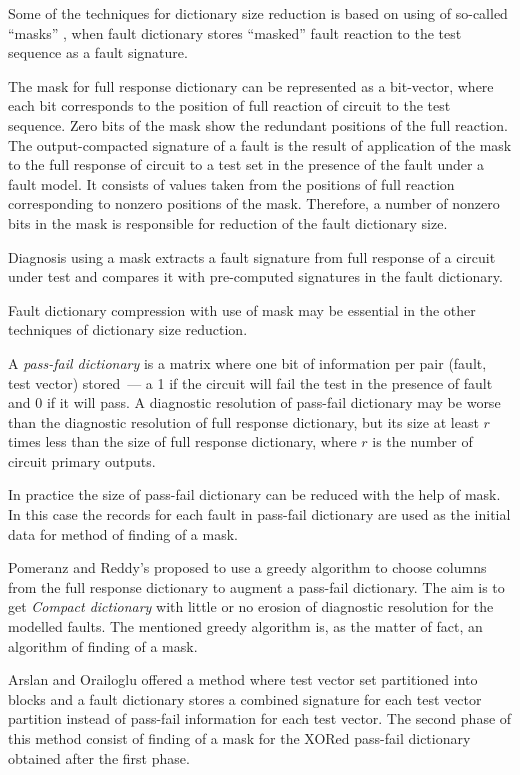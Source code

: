 \documentclass{article}
\begin{document}
Some of the techniques for dictionary size reduction is based on
using of so-called ``masks'' \cite{Speran-book, Chipulis-75-1,
Chipulis-75-2, Chipulis-77, Malyshenko-Razdobreev, Sharshunov-73,
Speranskiy-84, Speranskiy-Shatokhina-85}, when fault dictionary
stores ``masked'' fault reaction to the test sequence as a fault
signature.

The mask for full response dictionary can be represented as a
bit-vector, where each bit corresponds to the position of full
reaction of circuit to the test sequence. Zero bits of the mask
show the redundant positions of the full reaction. The
output-compacted signature of a fault is the result of application
of the mask to the full response of circuit to a test set in the
presence of the fault under a fault model. It consists of  values
taken from the positions of full reaction corresponding to nonzero
positions of the mask. Therefore, a number of nonzero bits in the
mask is responsible for reduction of the fault dictionary size.

Diagnosis using a mask extracts a fault signature from full
response of a circuit under test and compares it with pre-computed
signatures in the fault dictionary.

Fault dictionary compression with use of mask may be essential in
the other techniques of dictionary size reduction.

A \emph{pass-fail dictionary} is a matrix where one bit of
information per pair (fault, test vector) stored~--- a 1 if the
circuit will fail the test in the presence of fault and 0 if it
will pass. A diagnostic resolution of pass-fail dictionary may be
worse than the diagnostic resolution of full response dictionary,
but its size at least $r$ times less than the size of full
response dictionary, where $r$ is the number of circuit primary
outputs.

In practice the size of pass-fail dictionary can be reduced with
the help of mask. In this case the records for each fault in
pass-fail dictionary are used as the initial data for method of
finding of a mask.

Pomeranz and Reddy's \cite{Pomeranz-Reddy} proposed to use a
greedy algorithm to choose columns from the full response
dictionary to augment a pass-fail dictionary. The aim is to get
\emph{Compact dictionary} with little or no erosion of diagnostic
resolution for the modelled faults. The mentioned greedy algorithm
is, as the matter of fact, an algorithm of finding of a mask.

Arslan and Orailoglu \cite{Arslan-Orailoglu} offered a method
where test vector set partitioned into blocks and a fault
dictionary stores a combined signature for each test vector
partition instead of pass-fail information for each test vector.
The second phase of this method consist of finding of a mask for
the XORed pass-fail dictionary obtained after the first phase.
\end{document}
